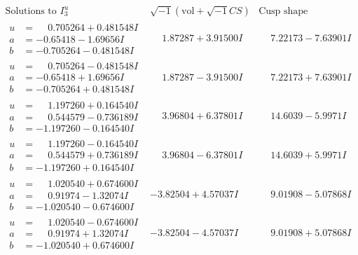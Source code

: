 \documentclass[1p]{elsarticle_modified}
\theoremstyle{definition}
\newcommand{\I}{\sqrt{-1}}
\begin{document}
$$\begin{array}{c|c|c}  
\text{Solutions to }I^u_{3}& \I (\text{vol} + \sqrt{-1}CS) & \text{Cusp shape}\\
 \hline 
\begin{aligned}
u &= \phantom{-}0.705264 + 0.481548 I \\
a &= -0.65418 - 1.69656 I \\
b &= -0.705264 - 0.481548 I\end{aligned}
 & \phantom{-}1.87287 + 3.91500 I & \phantom{-}7.22173 - 7.63901 I \\ \hline\begin{aligned}
u &= \phantom{-}0.705264 - 0.481548 I \\
a &= -0.65418 + 1.69656 I \\
b &= -0.705264 + 0.481548 I\end{aligned}
 & \phantom{-}1.87287 - 3.91500 I & \phantom{-}7.22173 + 7.63901 I \\ \hline\begin{aligned}
u &= \phantom{-}1.197260 + 0.164540 I \\
a &= \phantom{-}0.544579 - 0.736189 I \\
b &= -1.197260 - 0.164540 I\end{aligned}
 & \phantom{-}3.96804 + 6.37801 I & \phantom{-}14.6039 - 5.9971 I \\ \hline\begin{aligned}
u &= \phantom{-}1.197260 - 0.164540 I \\
a &= \phantom{-}0.544579 + 0.736189 I \\
b &= -1.197260 + 0.164540 I\end{aligned}
 & \phantom{-}3.96804 - 6.37801 I & \phantom{-}14.6039 + 5.9971 I \\ \hline\begin{aligned}
u &= \phantom{-}1.020540 + 0.674600 I \\
a &= \phantom{-}0.91974 - 1.32074 I \\
b &= -1.020540 - 0.674600 I\end{aligned}
 & -3.82504 + 4.57037 I & \phantom{-}9.01908 - 5.07868 I \\ \hline\begin{aligned}
u &= \phantom{-}1.020540 - 0.674600 I \\
a &= \phantom{-}0.91974 + 1.32074 I \\
b &= -1.020540 + 0.674600 I\end{aligned}
 & -3.82504 - 4.57037 I & \phantom{-}9.01908 + 5.07868 I \\ \hline\begin{aligned}

\end{aligned}
\end{array}$$
\end{document}
